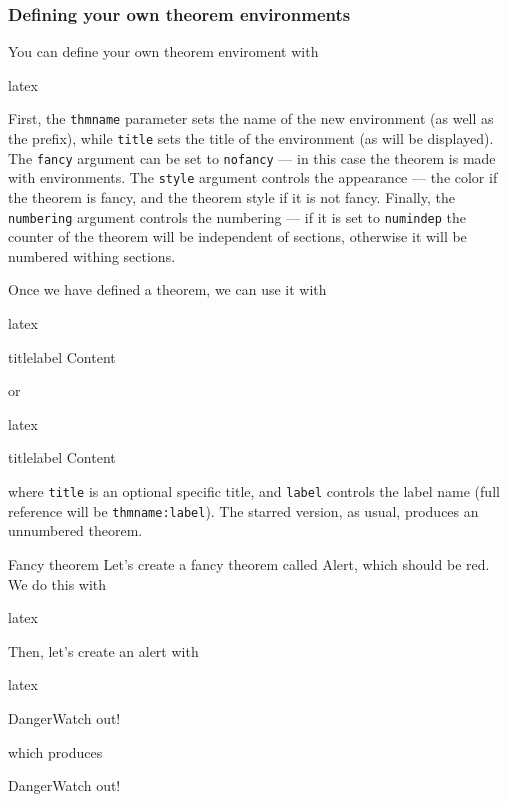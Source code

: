 \documentclass{notes}
\begin{document}
\subsubsection{Defining your own theorem environments}
You can define your own theorem enviroment with
\begin{tminted}{latex}
\end{tminted}

First, the \texttt{thmname} parameter sets the name of the new environment (as well as the  prefix), while \texttt{title} sets the title of the environment (as will be displayed). The \texttt{fancy} argument can be set to \texttt{nofancy} --- in this case the theorem is made with  environments. The \texttt{style} argument controls the appearance --- the color if the theorem is fancy, and the  theorem style if it is not fancy. Finally, the \texttt{numbering} argument controls the numbering --- if it is set to \texttt{numindep} the counter of the theorem will be independent of sections, otherwise it will be numbered withing sections.

Once we have defined a theorem, we can use it with
\begin{tminted}{latex}
\begin{thmname}{title}{label}
Content
\end{thmname}
\end{tminted}

or

\begin{tminted}{latex}
\begin{thmname*}{title}{label}
Content
\end{thmname*}
\end{tminted}

where \texttt{title} is an optional specific title, and \texttt{label} controls the label name (full reference will be \texttt{thmname:label}). The starred version, as usual, produces an unnumbered theorem.

\begin{exm}{Fancy theorem}{}
Let's create a fancy theorem called Alert, which should be red. We do this with
\begin{tminted}{latex}
\end{tminted}

Then, let's create an alert with
\begin{tminted}{latex}
\begin{alrt}{}{Danger}Watch out!\end{alrt}
\end{tminted}

which produces
\begin{alrt}{Danger}{}Watch out!\end{alrt}

\end{exm}
\end{document}
